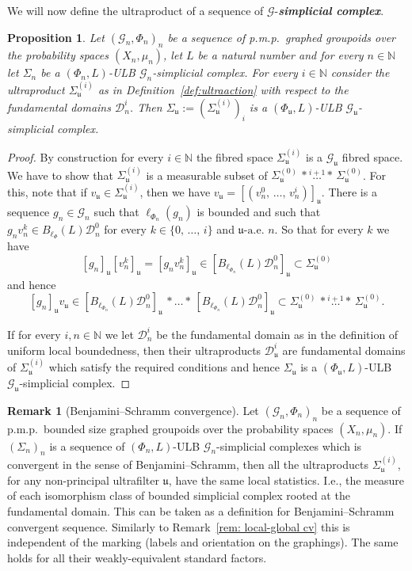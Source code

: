 \documentclass[10pt]{amsart}
\newtheorem{prop}[cdrthm]{Proposition}
\theoremstyle{definition}
\newtheorem{rema}[cdrthm]{Remark}
\newcommand{\defin}[1]{\textbf{\emph{#1}}}
\newcommand{\Nmath}{\mathbb{N}}
\newcommand{\cg}{\mathcal{G}}
\newcommand{\cd}{\mathcal{D}}
\newcommand{\ul}{\mathfrak{u}}
\newcommand{\ulae}{\mathfrak{u}\textrm{-a.e. }n}
\newcommand{\pmp}{p.m.p.\ }
\begin{document}
We will now define the ultraproduct of a sequence of $\cg$-\defin{simplicial complex}.

\begin{prop}\label{prop:simpliciallimit}
Let $(\cg_n,\Phi_n)_n$ be a sequence of \pmp graphed groupoids over the probability spaces $(X_n,\mu_n)$, let $L$ be a natural number and for every $n\in\Nmath$ let $\Sigma_n$ be a $(\Phi_n,L)$-ULB $\cg_n$-simplicial complex. For every $i\in\Nmath$ consider the ultraproduct $\Sigma_\ul^{(i)}$ as in Definition~\ref{def:ultraaction} with respect to the fundamental domains $\cd_n^i$. Then $\Sigma_\ul:=(\Sigma_\ul^{(i)})_i$ is a $(\Phi_\ul,L)$-ULB $\cg_\ul$-simplicial complex.
\end{prop}
\begin{proof}
By construction for every $i\in\Nmath$ the fibred space $\Sigma_\ul^{(i)}$ is a $\cg_\ul$ fibred space. We have to show that $\Sigma_\ul^{(i)}$ is a measurable subset of $\Sigma_\ul^{(0)}\,*\stackrel{i+1}{\ldots}*\,\Sigma_\ul^{(0)}$. For this, note that if $v_\ul\in \Sigma_\ul^{(i)}$, then we have $v_\ul=[(v_n^0,\,\ldots,\,v_n^i)]_\ul$. There is a sequence $g_n \in \cg_n$ such that $\ell_{\Phi_n}(g_n)$ is bounded and such that $g_nv_n^k\in B_{\ell_\Phi}(L)\cd_n^0$ for every $k\in\{0,\,\ldots,\,i\}$ and $\ulae$. So that for every $k$ we have
\[
[g_n]_\ul[v_n^k]_\ul=[g_nv_n^k]_\ul\in \left[B_{\ell_{\Phi_n}}(L)\cd_n^0\right]_\ul\subset \Sigma_\ul^{(0)}
\]
and hence
\[
[g_n]_\ul v_\ul\in \left[B_{\ell_{\Phi_n}}(L)\cd_n^0\right]_\ul\,*\ldots*\,\left[B_{\ell_{\Phi_n}}(L)\cd_n^0\right]_\ul\subset \Sigma_\ul^{(0)}\,*\stackrel{i+1}{\ldots}*\,\Sigma_\ul^{(0)}.
\]

If for every $i,n\in\Nmath$ we let $\cd_n^i$ be the fundamental domain as in the definition of uniform local boundedness, then their ultraproducts $\cd_\ul^i$ are fundamental domains of $\Sigma_\ul^{(i)}$ which satisfy the required conditions and hence $\Sigma_\ul$ is a $(\Phi_\ul,L)$-ULB $\cg_\ul$-simplicial complex.
\end{proof}


\begin{rema}[Benjamini--Schramm convergence]\label{rem: BS-CV of complexes}
Let $(\cg_n,\Phi_n)_n$ be a sequence of \pmp bounded size graphed groupoids over the probability spaces $(X_n,\mu_n)$. If $(\Sigma_n)_n$ is a sequence of $(\Phi_n,L)$-ULB $\cg_n$-simplicial complexes which is convergent in the sense of Benjamini--Schramm, then all the ultraproducts $\Sigma_\ul^{(i)}$, for any non-principal ultrafilter $\ul$, have the same local statistics. I.e., the measure of each isomorphism class of bounded simplicial complex rooted at the fundamental domain. This can be taken as a definition for Benjamini--Schramm convergent sequence. Similarly to Remark~\ref{rem: local-global cv} this is independent of the marking (labels and orientation on the graphings). The same holds for all their weakly-equivalent standard factors.
\end{rema}
\end{document}
